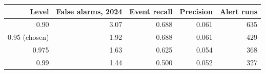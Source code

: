 \begin{tabular}{rrrrr}
\toprule
\textbf{Level} & \textbf{False alarms, 2024} & \textbf{Event recall} & \textbf{Precision} & \textbf{Alert runs} \\
\midrule
0.90 & 3.07 & 0.688 & 0.061 & 635 \\
0.95 (chosen) & 1.92 & 0.688 & 0.061 & 429 \\
0.975 & 1.63 & 0.625 & 0.054 & 368 \\
0.99 & 1.44 & 0.500 & 0.052 & 327 \\
\bottomrule
\end{tabular}
